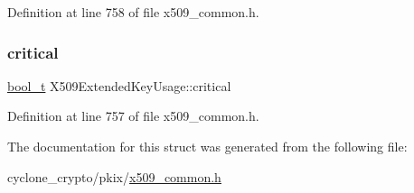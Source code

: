 Definition at line 758 of file x509\+\_\+common.\+h.

\mbox{\label{structX509ExtendedKeyUsage_a482c22b220014930529c692a4138e958}} 
\subsubsection{\texorpdfstring{critical}{critical}}
{\footnotesize\ttfamily \hyperlink{compiler__port_8h_a812d16e5494522586b3784e55d479912}{bool\+\_\+t} X509\+Extended\+Key\+Usage\+::critical}



Definition at line 757 of file x509\+\_\+common.\+h.



The documentation for this struct was generated from the following file\+:\begin{DoxyCompactItemize}
\item 
cyclone\+\_\+crypto/pkix/\hyperlink{pkix_2x509__common_8h}{x509\+\_\+common.\+h}\end{DoxyCompactItemize}
